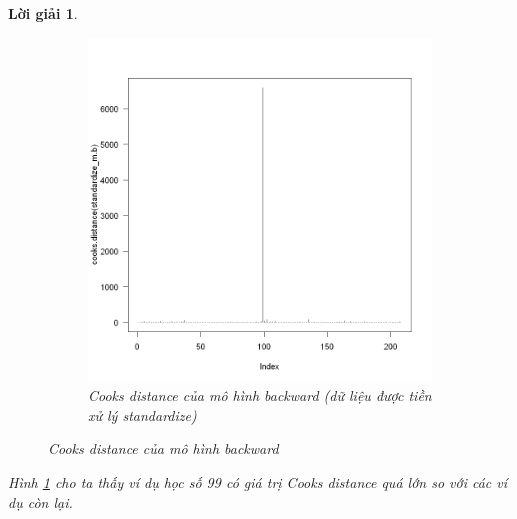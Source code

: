 \documentclass[14pt, a4paper]{article}
\theoremstyle{sltheorem}
\theoremstyle{soltheorem}
\newtheorem*{loigiai}{Lời giải}
\begin{document}
\begin{loigiai}
\begin{figure}[h!]
\begin{subfigure}[b]{0.4\textwidth}
            \includegraphics[width=\textwidth]{figures/standardize_mb_cooks.png}
            \caption{Cooks distance của mô hình backward (dữ liệu được tiền xử lý standardize)}
        \end{subfigure}
        \caption{Cooks distance của mô hình backward}
        \label{fig:Cooks-distance-mb}
    \end{figure}

    Hình \ref{fig:Cooks-distance-mb} cho ta thấy ví dụ học số 99 có giá trị Cooks distance quá lớn so với các ví dụ còn lại.


\end{loigiai}
\end{document}
